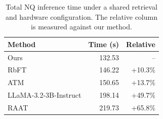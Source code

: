 \documentclass[11pt]{article}
\begin{document}
\begin{enumerate}
\begin{table}[t]
  \centering
  \small
  \caption{Total NQ inference time under a shared retrieval and hardware configuration. The relative column is measured against our method.}
  \label{tab:inference_time}
  \setlength{\tabcolsep}{5pt}
  \begin{tabular}{lrr}
    \toprule
    \textbf{Method} & \textbf{Time (s)} & \textbf{Relative} \\
    \midrule
    Ours & 132.53 & -- \\
    RbFT & 146.22 & +10.3\% \\
    ATM & 150.65 & +13.7\% \\
    LLaMA-3.2-3B-Instruct & 198.14 & +49.7\% \\
    RAAT & 219.73 & +65.8\% \\
    \bottomrule
  \end{tabular}
\end{table}
\end{enumerate}
\end{document}
